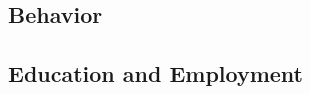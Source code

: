 \documentclass[letterpaper,man,apacite]{apa6}
\begin{document}
\subsection{Behavior}

 

\subsection{Education and Employment}
\end{document}
